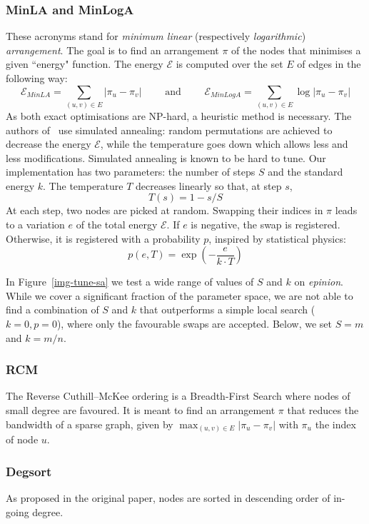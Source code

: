 \subsubsection{MinLA and MinLogA} These acronyms stand for \textit{minimum linear} (respectively \textit{logarithmic}) \textit{arrangement}. The goal is to find an arrangement $\pi$ of the nodes that minimises a given ``energy" function. The energy $\mathcal{E}$ is computed over the set $E$ of edges in the following way:
$$\mathcal{E}_{MinLA}=\sum_{(u,v)\in E} |\pi_u-\pi_v|
\qquad\text{ and }\qquad
\mathcal{E}_{MinLogA}=\sum_{(u,v)\in E} \log|\pi_u-\pi_v|$$
%
As both exact optimisations are NP-hard, a heuristic method is necessary. The authors of~\cite{gorder} use simulated annealing: random permutations are achieved to decrease the energy $\mathcal{E}$, while the temperature goes down which allows less and less modifications. 
%
Simulated annealing is known to be hard to tune. Our implementation has two parameters: the number of steps $S$
and the standard energy $k$.
%
The temperature $T$ decreases linearly so that, at step $s$, $$T(s) = 1 - s/S$$
%
At each step, two nodes are picked at random. Swapping their indices in $\pi$ leads to a variation $e$ of the total energy $\mathcal{E}$. If $e$ is negative, the swap is registered. Otherwise, it is registered with a probability $p$, inspired by statistical physics:
$$p(e,T)=\exp\left(-\frac{e}{k\cdot T}\right)$$

 In Figure~\ref{img-tune-sa} we test a wide range of values of $S$ and $k$ on \textit{epinion}. 
 While we cover a significant fraction of the parameter space,  we are not able to find a combination of $S$ and $k$ that outperforms a simple local search ($k=0,p=0$), where only the favourable swaps are accepted. Below, we set $S=m$ and $k=m/n$.
 


\subsubsection{RCM}
The Reverse Cuthill–McKee ordering \cite{rcm} is a Breadth-First Search where nodes of small degree are favoured. It is meant to find an arrangement $\pi$ that reduces the bandwidth of a sparse graph, given by $\max_{(u,v)\in E} |\pi_u-\pi_v|$ with $ \pi_u $ the index of node $u$.

\subsubsection{Degsort} 
As proposed in the original paper, nodes are sorted in descending order of in-going degree.


